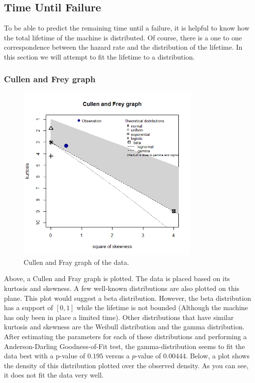 \subsection{Time Until Failure}
To be able to predict the remaining time until a failure, it is helpful to know how the total lifetime of the machine is distributed. Of course, there is a one to one correspondence between the hazard rate and the distribution of the lifetime. In this section we will attempt to fit the lifetime to a distribution.

\subsubsection{Cullen and Frey graph}
\begin{figure}[H]
\centering
\includegraphics[width=0.8\textwidth]{Plots/CullenAndFray.png}
\caption{Cullen and Fray graph of the data.}
\end{figure}
Above, a Cullen and Fray graph is plotted. The data is placed based on its kurtosis and skewness. A few well-known distributions are also plotted on this plane.  This plot would suggest a beta distribution. However, the beta distribution has a support of $[0,1]$ while the lifetime is not bounded (Although the machine has only been in place a limited time). Other distributions that have similar kurtosis and skewness are the Weibull distribution and the gamma distribution.\\
After estimating the parameters for each of these distributions and performing a Anderson-Darling Goodness-of-Fit test, the gamma-distribution seems to fit the data best with a p-value of $0.195$ versus a $p$-value of $0.00444$. Below, a plot shows the density of this distribution plotted over the observed density. As you can see, it does not fit the data very well.
